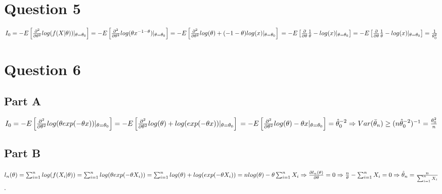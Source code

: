 \documentclass[11pt]{article} %
\begin{document}
\section{Question 5} %
$I_0 = -E\left[ \frac{\partial^2}{\partial \theta^2} log(f(X|\theta))|_{\theta = \theta_0}\right] = -E\left[ \frac{\partial^2}{\partial \theta^2} log(\theta x^{-1-\theta})|_{\theta = \theta_0}\right] = -E\left[ \frac{\partial^2}{\partial \theta^2} log(\theta)+(-1-\theta)log(x)|_{\theta = \theta_0}\right] \\ 
= -E\left[ \frac{\partial}{\partial \theta} \frac{1}{\theta}-log(x)|_{\theta = \theta_0}\right] =  -E\left[ \frac{\partial}{\partial \theta} \frac{1}{\theta}-log(x)|_{\theta = \theta_0}\right] = \frac{1}{\theta_0^2}$%
\section{Question 6} %
\subsection{Part A}
$I_0 = -E\left[ \frac{\partial^2}{\partial \theta^2} log(\theta exp(-\theta x))|_{\theta = \theta_0} \right] = -E\left[ \frac{\partial^2}{\partial \theta^2} log(\theta)+ log(exp(-\theta x)) |_{\theta = \theta_0}\right] \\= -E\left[ \frac{\partial^2}{\partial \theta^2} log(\theta)-\theta x |_{\theta = \theta_0}\right] = \hat{\theta}^{-2}_0 \Rightarrow Var(\bar{\theta}_n) \geq (n \hat{\theta}^{-2}_0)^{-1} = \frac{ \theta^{2}_0}{n}$
\subsection{Part B}
$l_n(\theta) = \sum_{i=1}^nlog(f(X_i|\theta)) = \sum_{i=1}^nlog(\theta exp(-\theta X_i)) = \sum_{i=1}^nlog(\theta)+ log(exp(-\theta X_i)) \\ = nlog(\theta)- \theta\sum_{i=1}^n X_i \Rightarrow \frac{\partial l_n(\theta)}{\partial \theta} = 0 \Rightarrow \frac{n}{\theta} - \sum_{i=1}^n X_i = 0 \Rightarrow \hat{\theta}_n =  \frac{n}{\sum_{i=1}^n X_i}$. 
\end{document}
